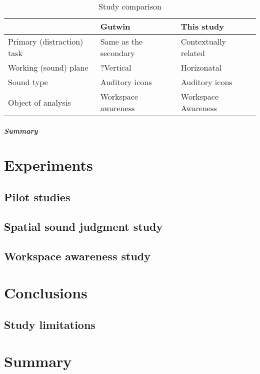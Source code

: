 \begin{table}[]
  \caption{Study comparison}
  \label{table:study_comp}
  \begin{tabular}{|l|l|l|}
  \hline
                             & Gutwin                & This study           \\ \hline
  Primary (distraction) task & Same as the secondary & Contextually related \\ \hline
  Working (sound) plane      & ?Vertical             & Horizonatal          \\ \hline
  Sound type                 & Auditory icons        & Auditory icons       \\ \hline
  Object of analysis         & Workspace awareness   & Workspace Awareness  \\ \hline
  \end{tabular}
\end{table}

\paragraph{Summary}
\chapter{Experiments}
\section{Pilot studies}
\section{Spatial sound judgment study}
\section{Workspace awareness study}



\chapter{Conclusions}
\section{Study limitations}
\chapter{Summary}

